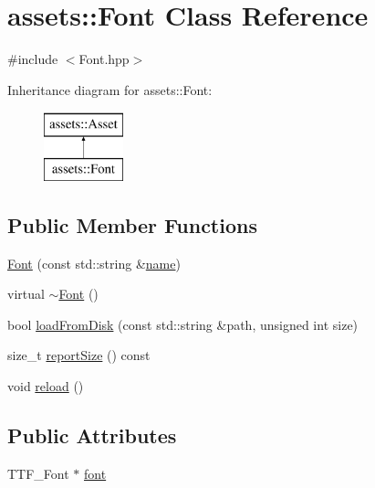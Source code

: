 \hypertarget{classassets_1_1Font}{\section{assets\-:\-:Font Class Reference}
\label{classassets_1_1Font}
}


{\ttfamily \#include $<$Font.\-hpp$>$}

Inheritance diagram for assets\-:\-:Font\-:\begin{figure}[H]
\begin{center}
\leavevmode
\includegraphics[height=2.000000cm]{classassets_1_1Font}
\end{center}
\end{figure}
\subsection*{Public Member Functions}
\begin{DoxyCompactItemize}
\item 
\hyperlink{classassets_1_1Font_acd4cd6549c3f8008301f7bd41ca02110}{Font} (const std\-::string \&\hyperlink{classassets_1_1Asset_a57fe90e1aa9281f2dd59041dffcc74b4}{name})
\item 
virtual \hyperlink{classassets_1_1Font_a2e4277a884d78111f6d6992888b4618c}{$\sim$\-Font} ()
\item 
bool \hyperlink{classassets_1_1Font_a24ba6dc9a9a86032de218ca0bc08dbb0}{load\-From\-Disk} (const std\-::string \&path, unsigned int size)
\item 
size\-\_\-t \hyperlink{classassets_1_1Font_ad844684d9e1fd08f9e77325b2ce71239}{report\-Size} () const 
\item 
void \hyperlink{classassets_1_1Font_a6be8d267aaa24657f8c23e3bfd7b85e9}{reload} ()
\end{DoxyCompactItemize}
\subsection*{Public Attributes}
\begin{DoxyCompactItemize}
\item 
T\-T\-F\-\_\-\-Font $\ast$ \hyperlink{classassets_1_1Font_aa15c7b8a6244a7e2db791137ee607bab}{font}
\end{DoxyCompactItemize}

